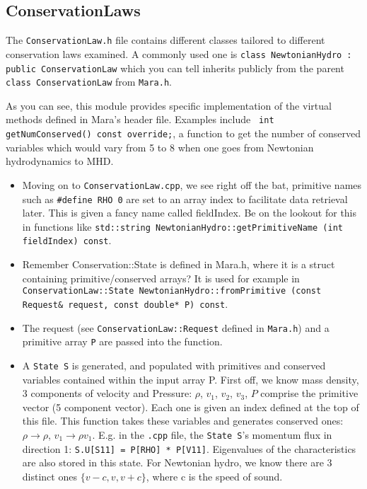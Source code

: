 \documentclass{article}
\begin{document}
\subsection{ConservationLaws}
The \texttt{ConservationLaw.h} file contains different classes tailored to different conservation laws examined. A commonly used one is \texttt{class NewtonianHydro : public ConservationLaw} which you can tell inherits publicly from the parent \texttt{class ConservationLaw} from \texttt{Mara.h}. 

As you can see, this module provides specific implementation of the virtual methods defined in Mara's header file. Examples include \texttt{  int getNumConserved() const override;}, a function to get the number of conserved variables which would vary from 5 to 8 when one goes from Newtonian hydrodynamics to MHD. 
\begin{itemize}
\item Moving on to \texttt{ConservationLaw.cpp}, we see right off the bat, primitive names such as \texttt{\#define RHO 0} are set to an array index to facilitate data retrieval later. This is given a fancy name called fieldIndex. Be on the lookout for this in functions like \texttt{std::string NewtonianHydro::getPrimitiveName (int fieldIndex) const}.

\item Remember Conservation::State is defined in Mara.h, where it is a struct containing primitive/conserved arrays? It is used for example in \texttt{ConservationLaw::State NewtonianHydro::fromPrimitive (const Request\& request, const double* P) const}. 

\item The request (see \texttt{ConservationLaw::Request} defined in \texttt{Mara.h}) and a primitive array \texttt{P} are passed into the function. 

\item A \texttt{State S} is generated, and populated with primitives and conserved variables contained within the input array P. First off, we know mass density, 3 components of velocity and Pressure: $\rho$, $v_1$, $v_2$, $v_3$, $P$ comprise the primitive vector (5 component vector). Each one is given an index defined at the top of this file. This function takes these variables and generates conserved ones: $\rho \rightarrow \rho$, $v_1 \rightarrow	\rho v_1$. E.g. in the \texttt{.cpp} file, the \texttt{State S}'s momentum flux in direction 1: \texttt{S.U[S11] = P[RHO] * P[V11]}. Eigenvalues of the characteristics are also stored in this state. For Newtonian hydro, we know there are 3 distinct ones $\{v-c,v,v+c\}$, where c is the speed of sound.


\end{itemize}
\end{document}
